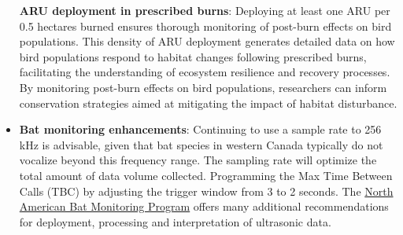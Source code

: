 \documentclass[
  letterpaper,
  DIV=11,
  numbers=noendperiod,
  oneside]{scrartcl}
\begin{document}
\begin{itemize}
  \textbf{ARU deployment in prescribed burns}: Deploying at least one
  ARU per 0.5 hectares burned ensures thorough monitoring of post-burn
  effects on bird populations. This density of ARU deployment generates
  detailed data on how bird populations respond to habitat changes
  following prescribed burns, facilitating the understanding of
  ecosystem resilience and recovery processes. By monitoring post-burn
  effects on bird populations, researchers can inform conservation
  strategies aimed at mitigating the impact of habitat disturbance.
\item
  \textbf{Bat monitoring enhancements}: Continuing to use a sample rate
  to 256 kHz is advisable, given that bat species in western Canada
  typically do not vocalize beyond this frequency range. The sampling
  rate will optimize the total amount of data volume collected.
  Programming the Max Time Between Calls (TBC) by adjusting the trigger
  window from 3 to 2 seconds. The
  \href{https://www.nabatmonitoring.org/}{North American Bat Monitoring
  Program} offers many additional recommendations for deployment,
  processing and interpretation of ultrasonic data.
\end{itemize}
\end{document}
